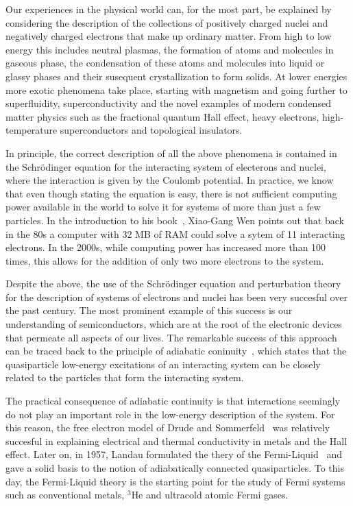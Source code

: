 \documentclass[oneside,11pt]{memoir}
\begin{document}
Our experiences in the physical world can, for the most part, be explained by
considering the description of the collections of positively charged nuclei and
negatively charged electrons that make up ordinary matter.    From high to low
energy this includes neutral plasmas,  the formation of atoms and molecules in
gaseous phase, the condensation of these atoms and molecules into liquid or
glassy phases and their susequent crystallization to form solids.   At lower
energies more exotic phenomena take place, starting with magnetism and going
further to superfluidity, superconductivity and the novel examples of modern
condensed matter physics such as the fractional quantum Hall effect, heavy
electrons, high-temperature superconductors and topological insulators.

In principle,  the correct description of all the above phenomena is contained
in the Schr\"{o}dinger equation for the interacting system of electerons and
nuclei,  where the interaction is given by the Coulomb potential. In practice,
we know that even though stating the equation is easy, there is not sufficient
computing power available in the world to solve it for systems of more than
just a few particles.  In the introduction to his book~\cite{wen2004quantum},
Xiao-Gang Wen points out that back in the 80s a computer with 32 MB of RAM
could solve a sytem of 11 interacting electrons.  In the 2000s, while computing
power has increased more than 100 times, this allows for the addition of only
two more electrons to the system.  

Despite the above,  the use of the Schr\"{o}dinger equation and perturbation
theory for the description of  systems of electrons and nuclei has been very
succesful over the past century.  The most prominent example of this success is
our understanding of semiconductors, which are at the root of the electronic
devices that permeate all aspects of our lives.  The remarkable success of this
approach can be traced back to the principle of adiabatic
coninuity~\cite{altland2010condensed}, which states that the quasiparticle
low-energy excitations of an interacting system can be closely related to the
particles that form the interacting system.  

The practical consequence of adiabatic continuity is that interactions
seemingly do not play an important role in the low-energy description of the
system.  For this reason, the free electron model of Drude and
Sommerfeld~\cite{ashcroft1976solid} was relatively succesful in explaining
electrical and thermal conductivity in metals and the Hall effect.   Later on,
in 1957, Landau formulated the thery of the
Fermi-Liquid~\cite{landau1965collected} and gave a solid basis to the notion of
adiabatically connected quasiparticles.  To this day, the Fermi-Liquid theory
is the starting point for the study of Fermi systems such as conventional
metals, $^{3}$He and ultracold atomic Fermi gases.
\end{document}
